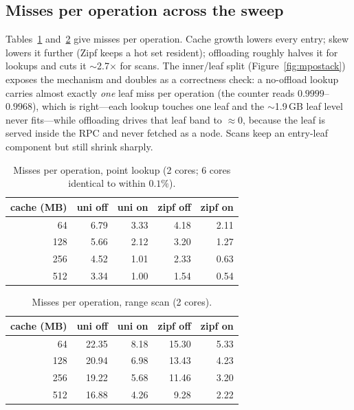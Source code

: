 \documentclass[sigconf,nonacm]{acmart}
\begin{document}
\subsection{Misses per operation across the sweep}
Tables~\ref{tab:mpo-lookup} and~\ref{tab:mpo-range} give misses per operation.
Cache growth lowers every entry; skew lowers it further (Zipf keeps a hot set
resident); offloading roughly halves it for lookups and cuts it $\sim$2.7$\times$
for scans. The inner/leaf split (Figure~\ref{fig:mpostack}) exposes the
mechanism and doubles as a correctness check: a no-offload lookup carries almost
exactly \emph{one} leaf miss per operation (the counter reads
$0.9999$--$0.9968$), which is right---each lookup touches one leaf and the
$\sim$1.9\,GB leaf level never fits---while offloading drives that leaf band to
$\approx0$, because the leaf is served inside the RPC and never fetched as a node.
Scans keep an entry-leaf component but still shrink sharply.

\begin{table}[t]
  \centering
  \caption{Misses per operation, point lookup (2 cores; 6 cores identical to
  within $0.1\%$).}
  \label{tab:mpo-lookup}
  \small
  \begin{tabular}{r rrrr}
    \toprule
    cache (MB) & uni off & uni on & zipf off & zipf on \\
    \midrule
    64  & 6.79 & 3.33 & 4.18 & 2.11 \\
    128 & 5.66 & 2.12 & 3.20 & 1.27 \\
    256 & 4.52 & 1.01 & 2.33 & 0.63 \\
    512 & 3.34 & 1.00 & 1.54 & 0.54 \\
    \bottomrule
  \end{tabular}
\end{table}

\begin{table}[t]
  \centering
  \caption{Misses per operation, range scan (2 cores).}
  \label{tab:mpo-range}
  \small
  \begin{tabular}{r rrrr}
    \toprule
    cache (MB) & uni off & uni on & zipf off & zipf on \\
    \midrule
    64  & 22.35 & 8.18 & 15.30 & 5.33 \\
    128 & 20.94 & 6.98 & 13.43 & 4.23 \\
    256 & 19.22 & 5.68 & 11.46 & 3.20 \\
    512 & 16.88 & 4.26 & \phantom{0}9.28 & 2.22 \\
    \bottomrule
  \end{tabular}
\end{table}
\end{document}
